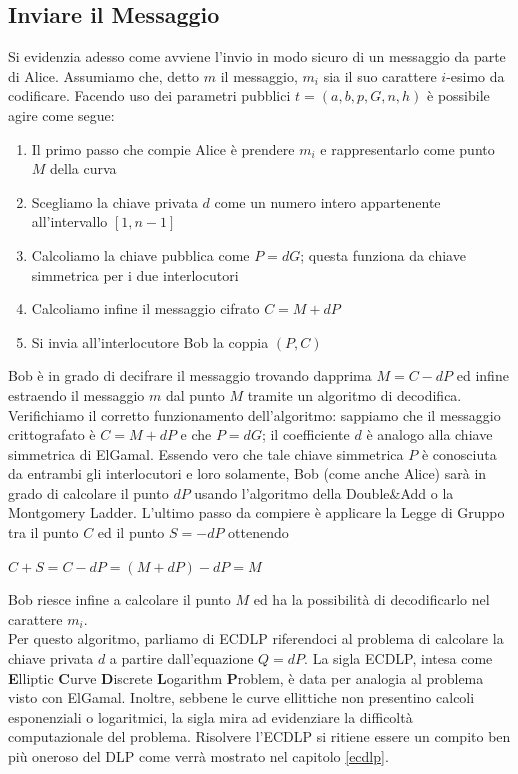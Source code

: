 \documentclass[a4paper,12pt]{tesiinfo}
\begin{document}
\subsection{Inviare il Messaggio}
\label{Crittografia Ellittica}
Si evidenzia adesso come avviene l'invio in modo sicuro di un messaggio da parte di Alice. Assumiamo che, detto $m$ il messaggio, $m_i$ sia il suo carattere $i$-esimo da codificare. Facendo uso dei parametri pubblici $t = (a, b, p, G, n, h)$ \`e possibile agire come segue:
\begin{enumerate}
 \item Il primo passo che compie Alice \`e prendere $m_i$ e rappresentarlo come punto $M$ della curva
 \item Scegliamo la chiave privata $d$ come un numero intero appartenente all'intervallo $[1, n-1]$
 \item Calcoliamo la chiave pubblica come $P = dG$; questa funziona da chiave simmetrica per i due interlocutori
 \item Calcoliamo infine il messaggio cifrato $C = M + dP$
 \item Si invia all'interlocutore Bob la coppia $(P, C)$
\end{enumerate}
Bob \`e in grado di decifrare il messaggio trovando dapprima $M= C-dP$ ed infine estraendo il messaggio $m$ dal punto $M$ tramite un algoritmo di decodifica.
\\
Verifichiamo il corretto funzionamento dell'algoritmo: sappiamo che il messaggio crittografato \`e $C = M + dP$ e che $P = dG$; il coefficiente $d$ \`e analogo alla chiave simmetrica di ElGamal. Essendo vero che tale chiave simmetrica $P$ \`e conosciuta da entrambi gli interlocutori e loro solamente, Bob (come anche Alice) sar\`a in grado di calcolare il punto $dP$ usando l'algoritmo della Double\&Add o la Montgomery Ladder. L'ultimo passo da compiere \`e applicare la Legge di Gruppo tra il punto $C$ ed il punto $S = -dP$ ottenendo \begin{center}
$C+S = C-dP = (M+dP) - dP = M$
\end{center}
Bob riesce infine a calcolare il punto $M$ ed ha la possibilit\`a di decodificarlo nel carattere $m_i$.
\\
Per questo algoritmo, parliamo di ECDLP riferendoci al problema di calcolare la chiave privata $d$ a partire dall'equazione $Q = dP$. La sigla ECDLP, intesa come \textbf{E}lliptic \textbf{C}urve \textbf{D}iscrete \textbf{L}ogarithm \textbf{P}roblem, \`e data per analogia al problema visto con ElGamal. Inoltre, sebbene le curve ellittiche non presentino calcoli esponenziali o logaritmici, la sigla mira ad evidenziare la difficolt\`a computazionale del problema. Risolvere l'ECDLP si ritiene essere un compito ben pi\`u oneroso del DLP come verr\`a mostrato nel capitolo \ref{ecdlp}.
%
%
%
%
%
%
%
%
%
%
%
%
%
\end{document}
